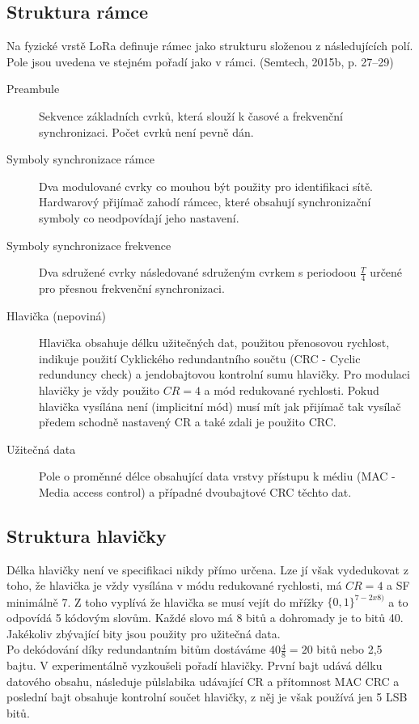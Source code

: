 \documentclass{ctuthesis}
\begin{document}
\subsection{Struktura rámce}
Na fyzické vrstě LoRa definuje rámec jako strukturu složenou z následujících polí. Pole jsou uvedena ve stejném pořadí jako v rámci.  (Semtech, 2015b, p. 27–29)
\begin{description}
\item[Preambule]
Sekvence základních cvrků, která slouží k časové a frekvenční synchronizaci. Počet cvrků není pevně dán.
\item[Symboly synchronizace rámce]
Dva modulované cvrky co mouhou být použity pro identifikaci sítě. Hardwarový přijímač zahodí rámcec, které obsahují synchronizační symboly co neodpovídají jeho nastavení.
\item[Symboly synchronizace frekvence]
Dva sdružené cvrky následované sdruženým cvrkem s periodoou $\frac{T}{4}$ určené pro přesnou frekvenční synchronizaci.
\item[Hlavička (nepoviná)]
Hlavička obsahuje délku užitečných dat, použitou přenosovou rychlost, indikuje použití Cyklického redundantního součtu (CRC - Cyclic redunduncy check) a jendobajtovou kontrolní sumu hlavičky. Pro modulaci hlavičky je vždy použito $CR =4$ a mód redukované rychlosti. Pokud hlavička vysílána není (implicitní mód) musí mít jak přijímač tak vysílač předem schodně nastavený CR a také zdali je použito CRC.
\item[Užitečná data]
Pole o proměnné délce obsahující data vrstvy přístupu k médiu (MAC - Media access control) a případné dvoubajtové CRC těchto dat.
\end{description}
\subsection{Struktura hlavičky}
Délka hlavičky není ve specifikaci nikdy přímo určena. Lze jí však vydedukovat z toho, že hlavička je vždy vysílána v módu redukované rychlosti, má $CR =4$ a SF minimálně 7. Z toho vyplívá že hlavička se musí vejít do mřížky $\{0,1\}^{7-2 x 8)}$ a to odpovídá 5 kódovým slovům. Každé slovo má 8 bitů a dohromady je to bitů 40. Jakékoliv zbývající bity jsou použity pro užitečná data. \\
Po dekódování díky redundantním bitům dostáváme $40\frac{4}{8} = 20$ bitů nebo 2,5 bajtu. V \cite{gr-lora2018} experimentálně vyzkoušeli pořadí hlavičky. První bajt udává délku datového obsahu, následuje půlslabika  udávající CR a přítomnost MAC CRC a poslední bajt obsahuje kontrolní součet hlavičky, z něj je však používá jen 5 LSB bitů.
\end{document}
